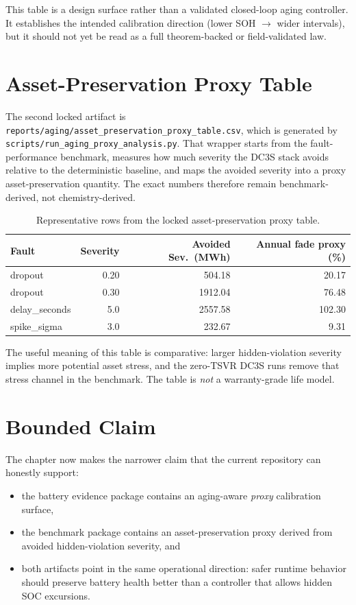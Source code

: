 This table is a design surface rather than a validated closed-loop aging
controller.  It establishes the intended calibration direction
(lower SOH $\rightarrow$ wider intervals), but it should not yet be read as a
full theorem-backed or field-validated law.

\section{Asset-Preservation Proxy Table}

The second locked artifact is
\texttt{reports/aging/asset\_preservation\_proxy\_table.csv}, which is
generated by \texttt{scripts/run\_aging\_proxy\_analysis.py}.  That wrapper
starts from the fault-performance benchmark, measures how much severity the
DC3S stack avoids relative to the deterministic baseline, and maps the
avoided severity into a proxy asset-preservation quantity.  The exact
numbers therefore remain benchmark-derived, not chemistry-derived.

\begin{table}[ht]
\centering
\caption{Representative rows from the locked asset-preservation proxy table.}
\label{tab:asset-preservation-proxy}
\begin{tabular}{lrrr}
\toprule
\textbf{Fault} & \textbf{Severity} & \textbf{Avoided Sev.\ (MWh)} &
  \textbf{Annual fade proxy (\%)} \\
\midrule
dropout & 0.20 & 504.18 & 20.17 \\
dropout & 0.30 & 1912.04 & 76.48 \\
delay\_seconds & 5.0 & 2557.58 & 102.30 \\
spike\_sigma & 3.0 & 232.67 & 9.31 \\
\bottomrule
\end{tabular}
\end{table}

The useful meaning of this table is comparative: larger hidden-violation
severity implies more potential asset stress, and the zero-TSVR DC3S runs
remove that stress channel in the benchmark.  The table is \emph{not} a
warranty-grade life model.

\section{Bounded Claim}

The chapter now makes the narrower claim that the current repository can
honestly support:

\begin{itemize}
  \item the battery evidence package contains an aging-aware \emph{proxy}
    calibration surface,
  \item the benchmark package contains an asset-preservation proxy derived
    from avoided hidden-violation severity, and
  \item both artifacts point in the same operational direction: safer
    runtime behavior should preserve battery health better than a controller
    that allows hidden SOC excursions.
\end{itemize}

